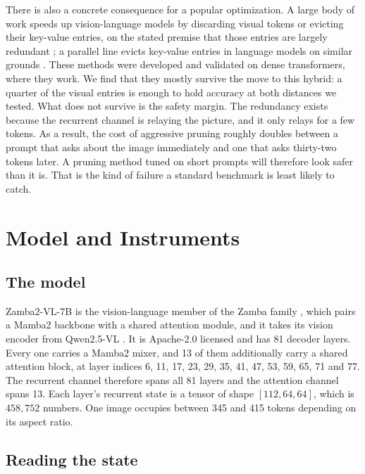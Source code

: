 \documentclass[10pt]{article}
\begin{document}
There is also a concrete consequence for a popular optimization. A large body
of work speeds up vision-language models by discarding visual tokens or
evicting their key-value entries, on the stated premise that those entries are
largely redundant \cite{chen2024fastv,yang2024visionzip,shang2025prumerge}; a
parallel line evicts key-value entries in language models on similar grounds
\cite{zhang2023h2o,li2024snapkv,xiao2024streaming}. These methods were
developed and validated on dense transformers, where they work. We find that
they mostly survive the move to this hybrid: a quarter of the visual entries
is enough to hold accuracy at both distances we tested. What does not survive
is the safety margin. The redundancy exists because the recurrent channel is
relaying the picture, and it only relays for a few tokens. As a result, the
cost of aggressive pruning roughly doubles between a prompt that asks about
the image immediately and one that asks thirty-two tokens later. A pruning
method tuned on short prompts will therefore look safer than it is. That is
the kind of failure a standard benchmark is least likely to catch.

\section{Model and Instruments}

\subsection{The model}

Zamba2-VL-7B \cite{zamba2vl} is the vision-language member of the Zamba family
\cite{glorioso2024zamba}, which pairs a Mamba2 backbone \cite{dao2024mamba2}
with a shared attention module, and it takes its vision encoder from Qwen2.5-VL
\cite{bai2025qwen25vl}. It is Apache-2.0 licensed and has 81 decoder layers. Every one carries a Mamba2
mixer, and 13 of them additionally carry a shared attention block, at layer
indices 6, 11, 17, 23, 29, 35, 41, 47, 53, 59, 65, 71 and 77. The recurrent
channel therefore spans all 81 layers and the attention channel spans 13. Each
layer's recurrent state is a tensor of shape $[112, 64, 64]$, which is
$458{,}752$ numbers. One image occupies between 345 and 415 tokens depending on
its aspect ratio.

\subsection{Reading the state}
\end{document}
